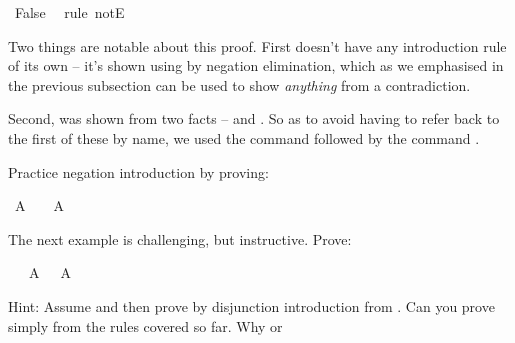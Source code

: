 \begin{isabellebody}
\ {\isachardoublequoteopen}False{\isachardoublequoteclose}\ \isamarkupfalse%
\ {\isacharparenleft}rule\ notE{\isacharparenright}\isanewline
{}\isamarkupfalse%
%
\endisatagproof
{\isafoldproof}%
%
\isadelimproof
%
\endisadelimproof
%
\begin{isamarkuptext}%
Two things are notable about this proof. First  doesn't have any introduction
rule of its own -- it's shown using by negation elimination, which as we emphasised in the previous
subsection can be used to show \emph{anything} from a contradiction.%
\end{isamarkuptext}\isamarkuptrue%
%
\begin{isamarkuptext}%
Second,  was shown from two facts --  and . So as to avoid
having to refer back to the first of these by name, we used the command  followed by
the command .%
\end{isamarkuptext}\isamarkuptrue%
%
\begin{isamarkuptext}%
\begin{Exercise}[label = doublenegationintroduction] 
Practice negation introduction by proving: \end{Exercise}%
\end{isamarkuptext}\isamarkuptrue%
\isamarkupfalse%
\ {\isachardoublequoteopen}A\ {\isasymlongrightarrow}\ {\isasymnot}\ {\isasymnot}\ A{\isachardoublequoteclose}%
\isadelimproof
\ %
\endisadelimproof
%
\isatagproof
{}\isamarkupfalse%
%
\endisatagproof
{\isafoldproof}%
%
\isadelimproof
%
\endisadelimproof
%
\begin{isamarkuptext}%
\begin{Exercise}\label{doubleexcludedmiddle} The next example is challenging, but instructive. Prove: \end{Exercise}%
\end{isamarkuptext}\isamarkuptrue%
\isamarkupfalse%
\ {\isachardoublequoteopen}{\isasymnot}\ {\isasymnot}\ {\isacharparenleft}A\ {\isasymor}\ {\isasymnot}\ A{\isacharparenright}{\isachardoublequoteclose}%
\isadelimproof
\ %
\endisadelimproof
%
\isatagproof
{}\isamarkupfalse%
%
\endisatagproof
{\isafoldproof}%
%
\isadelimproof
%
\endisadelimproof
%
\begin{isamarkuptext}%
Hint: Assume  and then prove  by disjunction introduction
from  . Can you prove simply  from the rules covered so far. Why or 

\end{isamarkuptext}
\end{isabellebody}
